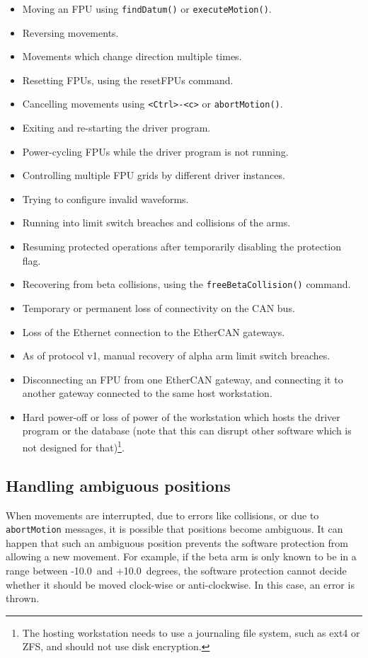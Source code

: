 \documentclass[11pt,a4paper]{scrartcl}
\begin{document}
\begin{itemize}
\item Moving an FPU using \texttt{findDatum()} or \texttt{executeMotion()}.
\item Reversing movements.
\item Movements which change direction multiple times.
\item Resetting FPUs, using the resetFPUs command.
\item Cancelling movements using \verb+<Ctrl>-<c>+ or \texttt{abortMotion()}.
\item Exiting and re-starting the driver program.
\item Power-cycling FPUs while the driver program is not running.
\item Controlling multiple FPU grids by different driver instances.
\item Trying to configure invalid waveforms.
\item Running into limit switch breaches and collisions of the arms.
\item Resuming protected operations after temporarily disabling the
  protection flag.
\item Recovering from beta collisions, using the
  \texttt{freeBetaCollision()} command.
\item Temporary or permanent loss of connectivity on the CAN bus.
\item Loss of the Ethernet connection to the EtherCAN gateways.
\item As of protocol v1, manual recovery of alpha arm limit switch
  breaches.
\item Disconnecting an FPU from one EtherCAN gateway, and connecting
  it to another gateway connected to the same host workstation. 
\item Hard power-off or loss of power of the workstation which hosts
  the driver program or the database (note that this can disrupt other
  software which is not designed for that)\footnote{The hosting
    workstation needs to use a journaling file system, such as ext4 or
    ZFS, and should not use disk encryption.}.
\end{itemize}

\subsection{Handling ambiguous positions}
%
When movements are interrupted, due to errors like
collisions, or due to \texttt{abortMotion} messages, it is possible
that positions become ambiguous. It can happen that such an ambiguous
position prevents the software protection from allowing a new
movement.  For example, if the beta arm is only known to be in a range
between -10.0\degree\ and +10.0\degree\ degrees, the software protection cannot decide
whether it should be moved clock-wise or anti-clockwise. In this case,
an error is thrown.
\end{document}

